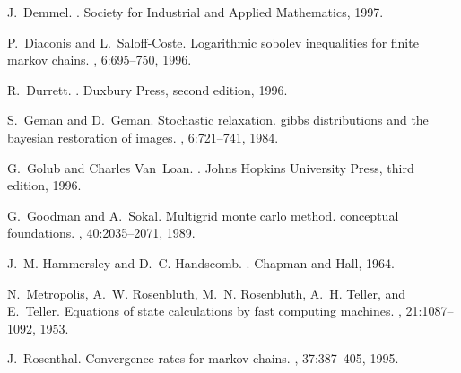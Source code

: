 \documentclass[12pt,letterpaper]{report}
\theoremstyle{plain}
\theoremstyle{definition}
\theoremstyle{remark}
\numberwithin{theorem}{chapter}
\numberwithin{claim}{chapter}
\numberwithin{equation}{chapter}
\numberwithin{conjecture}{chapter}
\newcommand\<{\ensuremath{\langle}}
\renewcommand\>{\ensuremath{\rangle}}
\begin{document}
\def\cprime{$'$} \def\cprime{$'$}
  \def\ocirc#1{\ifmmode\setbox0=\hbox{$#1$}\dimen0=\ht0 \advance\dimen0
  by1pt\rlap{\hbox to\wd0{\hss\raise\dimen0
  \hbox{\hskip.2em$\scriptscriptstyle\circ$}\hss}}#1\else {\accent"17 #1}\fi}
\begin{thebibliography}{1}

J.~Demmel.
.
\newblock Society for Industrial and Applied Mathematics, 1997.

P.~Diaconis and L.~Saloff-Coste.
\newblock Logarithmic sobolev inequalities for finite markov chains.
, 6:695--750, 1996.

R.~Durrett.
.
\newblock Duxbury Press, second edition, 1996.

S.~Geman and D.~Geman.
\newblock Stochastic relaxation. gibbs distributions and the bayesian
  restoration of images.
,
  6:721--741, 1984.

G.~Golub and Charles Van~Loan.
.
\newblock Johns Hopkins University Press, third edition, 1996.

G.~Goodman and A.~Sokal.
\newblock Multigrid monte carlo method. conceptual foundations.
, 40:2035--2071, 1989.

J.~M. Hammersley and D.~C. Handscomb.
.
\newblock Chapman and Hall, 1964.

N.~Metropolis, A.~W. Rosenbluth, M.~N. Rosenbluth, A.~H. Teller, and E.~Teller.
\newblock Equations of state calculations by fast computing machines.
, 21:1087--1092, 1953.

J.~Rosenthal.
\newblock Convergence rates for markov chains.
, 37:387--405, 1995.

\end{thebibliography}
\end{document}
